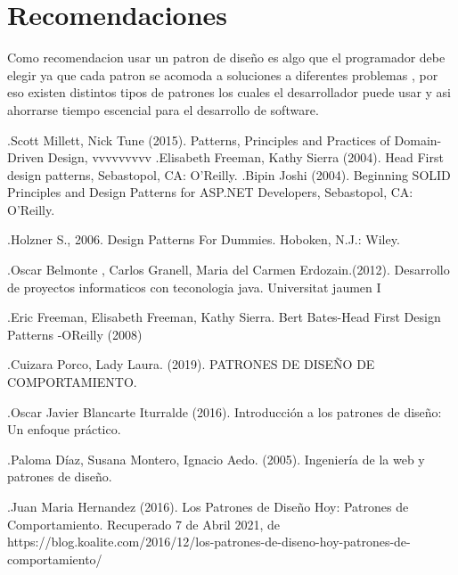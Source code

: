 \documentclass[twoside,twocolumn]{article}
\begin{document}
\section{Recomendaciones}
Como recomendacion usar un patron de diseño es algo que el programador
debe elegir ya que cada patron se acomoda a soluciones a diferentes problemas 
, por eso existen distintos tipos de patrones los cuales el desarrollador puede usar y
 asi ahorrarse tiempo escencial para el desarrollo de software.
\begin{thebibliography}{99} %

\bibitem.Scott Millett, Nick Tune (2015).
\newblock Patterns, Principles and Practices of Domain-Driven Design,
vvvvvvvvv
\bibitem.Elisabeth Freeman, Kathy Sierra (2004).
\newblock Head First design patterns,
\newblock Sebastopol,
\newblock CA: O'Reilly.
\bibitem
.Bipin Joshi (2004).
\newblock Beginning SOLID Principles and Design Patterns for ASP.NET Developers,
\newblock Sebastopol,
\newblock CA: O'Reilly.

\bibitem .Holzner
\newblock S., 2006. Design Patterns For Dummies. Hoboken, N.J.: Wiley.
 
\bibitem .Oscar Belmonte 
\newblock , Carlos Granell, Maria del Carmen Erdozain.(2012).
\newblock Desarrollo de proyectos informaticos con teconologia java. Universitat jaumen I

\bibitem .Eric Freeman, Elisabeth Freeman, Kathy Sierra.
\newblock  Bert Bates-Head First Design Patterns -OReilly (2008) 

\bibitem .Cuizara Porco, Lady Laura. (2019).
\newblock PATRONES DE DISEÑO DE COMPORTAMIENTO. 


\bibitem .Oscar Javier Blancarte Iturralde (2016).
\newblock Introducción a los patrones de diseño: Un enfoque práctico.

\bibitem .Paloma Díaz, Susana Montero, Ignacio Aedo. (2005). 
\newblock Ingeniería de la web y patrones de diseño.


\bibitem .Juan Maria Hernandez (2016).
\newblock Los Patrones de Diseño Hoy: Patrones de Comportamiento. Recuperado 7 de Abril 2021, de https://blog.koalite.com/2016/12/los-patrones-de-diseno-hoy-patrones-de-comportamiento/
 
\end{thebibliography}

\end{document}
